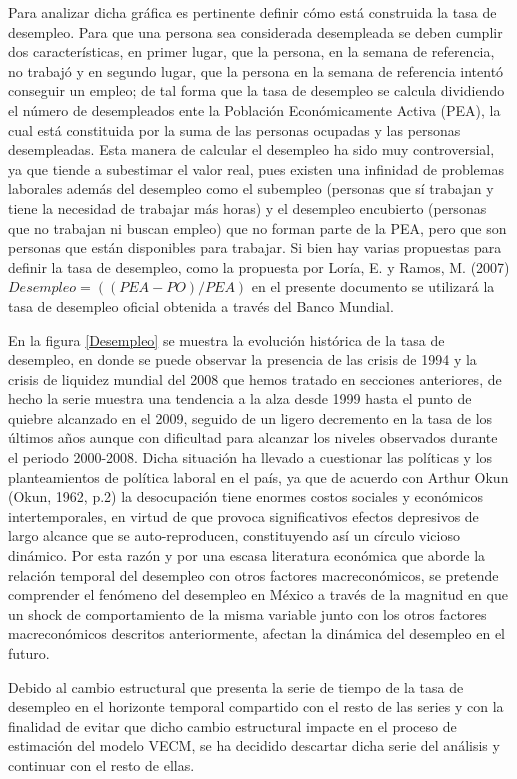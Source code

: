 Para analizar dicha gráfica es pertinente definir cómo está construida la tasa de desempleo. Para que una persona sea considerada desempleada se deben cumplir dos características, en primer lugar, que la persona, en la semana de referencia, no trabajó y en segundo lugar, que la persona en la semana de referencia intentó conseguir un empleo; de tal forma que la tasa de desempleo se calcula dividiendo el número de desempleados ente la Población Económicamente Activa (PEA), la cual está constituida por la suma de las personas ocupadas y las personas desempleadas. Esta manera de calcular el desempleo ha sido muy controversial, ya que tiende a subestimar el valor real, pues existen una infinidad de problemas laborales además del desempleo como el subempleo (personas que sí trabajan y tiene la necesidad de trabajar más horas)  y el desempleo encubierto (personas que no trabajan ni buscan empleo) que no forman parte de la PEA, pero que son personas que están disponibles para trabajar. Si bien hay varias propuestas para definir la tasa de desempleo, como la propuesta por Loría, E. y Ramos, M. (2007) $Desempleo = ((PEA-PO)/PEA)$ en el presente documento se utilizará la tasa de desempleo oficial obtenida a través del Banco Mundial.\bigskip

En la figura  \ref{Desempleo} se muestra la evolución histórica de la tasa de desempleo, en donde se puede observar la presencia de las crisis de 1994 y la crisis de liquidez mundial del 2008 que hemos tratado en secciones anteriores, de hecho la serie muestra una tendencia a la alza desde 1999 hasta el punto de quiebre alcanzado en el 2009, seguido de un ligero decremento en la tasa de los últimos años aunque con dificultad para alcanzar los niveles observados durante el periodo 2000-2008. Dicha situación ha llevado a cuestionar las políticas y los planteamientos de política laboral en el país,  ya que de acuerdo con Arthur Okun (Okun, 1962, p.2) la desocupación tiene enormes costos sociales y económicos intertemporales, en virtud de que provoca significativos efectos depresivos de largo alcance que se auto-reproducen, constituyendo así un círculo vicioso dinámico. Por esta razón y por una escasa literatura económica que aborde la relación temporal del desempleo con otros factores macreconómicos, se pretende comprender el fenómeno del desempleo en México a través de la magnitud en que un shock de comportamiento de la misma variable junto con los otros factores macreconómicos descritos anteriormente, afectan la dinámica del desempleo en el futuro.\bigskip

Debido al cambio estructural que presenta la serie de tiempo de la tasa de desempleo en el horizonte temporal compartido con el resto de las series y con la finalidad de evitar que dicho cambio estructural impacte en el proceso de estimación del modelo VECM, se ha decidido descartar dicha serie del análisis y continuar con el resto de ellas.